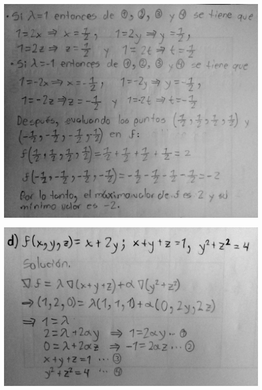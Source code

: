 \documentclass[fleqn, 12pt]{article}
\begin{document}
\begin{list}{\bfseries Ejercicio}{ \addtolength{\itemindent}{-1mm}%
    \addtolength{\labelsep}{-1mm}%
    \addtolength{\leftmargin}{-1cm}%
    \addtolength{\labelwidth}{-1cm} }
\begin{enumerate}[a)]
        \includegraphics[width = 1.0\linewidth]{Ejercicio c2.jpg}
    
        \includegraphics[width = 1.0\linewidth]{Ejercicio d1.jpg}
       

\end{enumerate}
\end{list}
\end{document}
